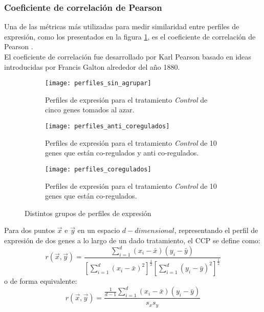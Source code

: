 \subsubsection{Coeficiente de correlación de Pearson}
Una de las métricas más utilizadas para medir similaridad entre perfiles de expresión, como los presentados en la figura \ref{fig:perfiles_sin_agrupar}, es el coeficiente de correlación de Pearson \cite{Babu2004}.\\
El coeficiente de correlación fue desarrollado por Karl Pearson basado en ideas introducidas por Francis Galton alrededor del año 1880.\\
\begin{figure*}[t!]
    \centering
    \begin{subfigure}[t]{0.6\textwidth}
    \centering
    \texttt{[image: perfiles\_sin\_agrupar]}
    \caption{Perfiles de expresión para el tratamiento \textit{Control} de cinco genes tomados al azar.}
    \label{fig:perfiles_sin_agrupar}
    \end{subfigure}    
    
    \begin{subfigure}[t]{0.45\textwidth}
    \centering
    \texttt{[image: perfiles\_anti\_coregulados]}
    \caption{Perfiles de expresión para el tratamiento \textit{Control} de 10 genes que están co-regulados y anti co-regulados.}
    \label{fig:perfiles_anti_coregulados}
    \end{subfigure}
    \begin{subfigure}[t]{0.45\textwidth}
    \centering
    \texttt{[image: perfiles\_coregulados]}
    \caption{Perfiles de expresión para el tratamiento \textit{Control} de 10 genes que están co-regulados.}
    \label{fig:perfiles_coregulados}
    \end{subfigure}
    \caption{Distintos grupos de perfiles de expresión}
\end{figure*}
Para dos puntos $\vec{x}$ e $\vec{y}$ en un espacio $d-dimensional$, representando el perfil de expresión de dos genes a lo largo de un dado tratamiento, el CCP se define como:
\begin{equation}
	r(\vec{x}, \vec{y}) = \frac{\sum\limits_{i=1}^d(x_i-\bar{x})(y_i-\bar{y})}{[\sum\limits_{i=1}^d(x_i-\bar{x})^2]^\frac{1}{2}[\sum\limits_{i=1}^d(y_i-\bar{y})^2]^\frac{1}{2}}
	\label{eq:ccp}
\end{equation}
o de forma equivalente:
\begin{equation}
	r(\vec{x}, \vec{y}) = \frac{\frac{1}{d-1}\sum\limits_{i=1}^d(x_i-\bar{x})(y_i-\bar{y})}{s_x s_y}
\end{equation}
